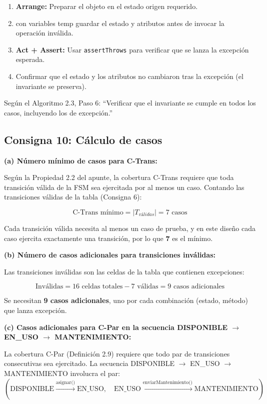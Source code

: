 \begin{enumerate}
    \item \textbf{Arrange:} Preparar el objeto en el estado origen requerido.
    \item con variables temp guardar el estado y atributos antes de invocar la operación inválida.
    \item \textbf{Act + Assert:} Usar \texttt{assertThrows} para verificar que se lanza la excepción esperada.
    \item Confirmar que el estado y los atributos no cambiaron tras la excepción (el invariante se preserva).
\end{enumerate}

Según el Algoritmo 2.3, Paso 6: ``Verificar que el invariante se cumple en todos los casos, incluyendo los de excepción.''

\subsection{Consigna 10: Cálculo de casos}

\textbf{(a) Número mínimo de casos para C-Trans:}

Según la Propiedad 2.2 del apunte, la cobertura C-Trans requiere que toda transición válida de la FSM sea ejercitada por al menos un caso. Contando las transiciones válidas de la tabla (Consigna 6):

\[
\text{C-Trans mínimo} = |T_{válidas}| = 7 \text{ casos}
\]

Cada transición válida necesita al menos un caso de prueba, y en este diseño cada caso ejercita exactamente una transición, por lo que \textbf{7} es el mínimo.

\textbf{(b) Número de casos adicionales para transiciones inválidas:}

Las transiciones inválidas son las celdas de la tabla que contienen excepciones:

\[
\text{Inválidas} = 16 \text{ celdas totales} - 7 \text{ válidas} = 9 \text{ casos adicionales}
\]

Se necesitan \textbf{9 casos adicionales}, uno por cada combinación (estado, método) que lanza excepción.

\textbf{(c) Casos adicionales para C-Par en la secuencia DISPONIBLE $\rightarrow$ EN\_USO $\rightarrow$ MANTENIMIENTO:}

La cobertura C-Par (Definición 2.9) requiere que todo par de transiciones consecutivas sea ejercitado. La secuencia DISPONIBLE $\rightarrow$ EN\_USO $\rightarrow$ MANTENIMIENTO involucra el par:
\[
(\text{DISPONIBLE} \xrightarrow{\text{asignar()}} \text{EN\_USO}, \quad \text{EN\_USO} \xrightarrow{\text{enviarMantenimiento()}} \text{MANTENIMIENTO})
\]

